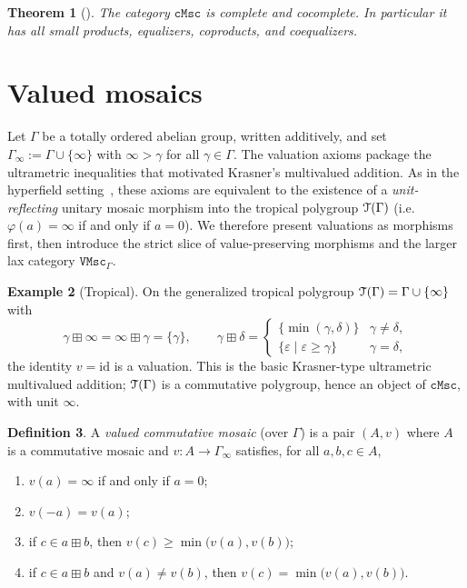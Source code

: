 \documentclass[11pt]{amsart}
\theoremstyle{plain}
\newtheorem{theorem}{Theorem}[section]
\theoremstyle{definition}
\newtheorem{definition}[theorem]{Definition}
\newtheorem{example}[theorem]{Example}
\theoremstyle{remark}
\newcommand{\T}{\EuScript{T}}
\newcommand{\cMsc}{\mathtt{cMsc}}
\newcommand{\VMscG}{\mathtt{VMsc}_{\Gamma}}
\begin{document}
\begin{theorem}[{\cite{NR23}}]
\label{thm:cmsc-good}
The category \(\cMsc\) is complete and cocomplete. In particular it has all small products, equalizers, coproducts, and coequalizers.
\end{theorem}


\section{Valued mosaics}
\label{sec:valued}

Let \(\Gamma\) be a totally ordered abelian group, written additively, and set \(\Gamma_\infty:=\Gamma\cup\{\infty\}\) with \(\infty>\gamma\) for all \(\gamma\in\Gamma\). The valuation axioms package the ultrametric inequalities that motivated Krasner's multivalued addition. As in the hyperfield setting~\cite{Lin23compl}, these axioms are equivalent to the existence of a \emph{unit-reflecting} unitary mosaic morphism into the tropical polygroup \(\T(\Gamma)\) (i.e.\ \(\varphi(a)=\infty\) if and only if \(a=0\)). We therefore present valuations as morphisms first, then introduce the strict slice of value-preserving morphisms and the larger lax category \(\VMscG\).

\begin{example}[Tropical]
\label{ex:trop-val}
On the generalized tropical polygroup \(\T(\Gamma)=\Gamma\cup\{\infty\}\) with
\[
\gamma\boxplus\infty=\infty\boxplus\gamma=\{\gamma\},
\qquad
\gamma\boxplus\delta=\begin{cases}\{\min(\gamma,\delta)\}&\gamma\neq\delta,\\ \{\varepsilon\mid\varepsilon\ge\gamma\}&\gamma=\delta,\end{cases}
\]
the identity \(v=\mathrm{id}\) is a valuation. This is the basic Krasner-type ultrametric multivalued addition; \(\T(\Gamma)\) is a commutative polygroup, hence an object of \(\cMsc\), with unit \(\infty\).
\end{example}

\begin{definition}
\label{def:valued-mosaic}
A \emph{valued commutative mosaic} (over \(\Gamma\)) is a pair \((A,v)\) where \(A\) is a commutative mosaic and \(v\colon A\to\Gamma_\infty\) satisfies, for all \(a,b,c\in A\),
\begin{enumerate}[label=(V\arabic*)]
\item\label{v1} \(v(a)=\infty\) if and only if \(a=0\);
\item\label{v2} \(v(-a)=v(a)\);
\item\label{v3} if \(c\in a\boxplus b\), then \(v(c)\ge\min\bigl(v(a),v(b)\bigr)\);
\item\label{v4} if \(c\in a\boxplus b\) and \(v(a)\neq v(b)\), then \(v(c)=\min\bigl(v(a),v(b)\bigr)\).
\end{enumerate}
\end{definition}
\end{document}
